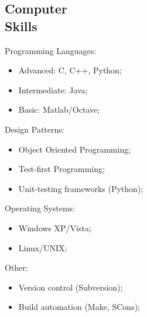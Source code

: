 \documentclass[margin,line]{resume}
\begin{document}
\begin{resume}
    

    


    \section{\mysidestyle Computer\\Skills} 

      Programming Languages:
      \begin{itemize}
          \item Advanced: C, C++, Python;
          \item Intermediate: Java;
          \item Basic: Matlab/Octave;
      \end{itemize}

      Design Patterns:
      \begin{itemize}
          \item Object Oriented Programming;
          \item Test-first Programming;
          \item Unit-testing frameworks (Python);
      \end{itemize}

      Operating Systems:
      \begin{itemize}
          \item Windows XP/Vista;
          \item Linux/UNIX;
      \end{itemize}

      Other:
      \begin{itemize}
          \item Version control (Subversion);
          \item Build automation (Make, SCons);
      \end{itemize}
    



\end{resume}
\end{document}
